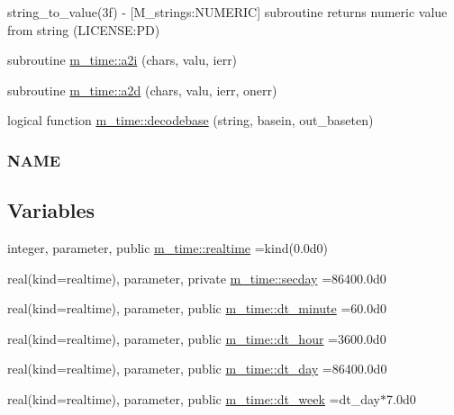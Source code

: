 \begin{DoxyCompactItemize}
\begin{DoxyCompactList}
string\+\_\+to\+\_\+value(3f) -\/ \mbox{[}M\+\_\+strings\+:N\+U\+M\+E\+R\+IC\mbox{]} subroutine returns numeric value from string (L\+I\+C\+E\+N\+SE\+:PD) \end{DoxyCompactList}\item 
subroutine \mbox{\hyperlink{namespacem__time_a200e48a4e0096b4343b0b72c95becd3d}{m\+\_\+time\+::a2i}} (chars, valu, ierr)
\item 
subroutine \mbox{\hyperlink{namespacem__time_a9d508147e28034267073619ba8a0e910}{m\+\_\+time\+::a2d}} (chars, valu, ierr, onerr)
\item 
logical function \mbox{\hyperlink{namespacem__time_a8dacab5686d74326cc68aa91b6f16c2d}{m\+\_\+time\+::decodebase}} (string, basein, out\+\_\+baseten)
\begin{DoxyCompactList}\small\item\em \subsubsection*{N\+A\+ME}\end{DoxyCompactList}\end{DoxyCompactItemize}
\subsection*{Variables}
\begin{DoxyCompactItemize}
\item 
integer, parameter, public \mbox{\hyperlink{namespacem__time_ac10ea9e8d59ec74eaa7d89f2517d7422}{m\+\_\+time\+::realtime}} =kind(0.\+0d0)
\item 
real(kind=realtime), parameter, private \mbox{\hyperlink{namespacem__time_a48130b5a95a3f2e776269dcee1426797}{m\+\_\+time\+::secday}} =86400.\+0d0
\item 
real(kind=realtime), parameter, public \mbox{\hyperlink{namespacem__time_a9fe6fbb44e2779a2fcf96fba36c08918}{m\+\_\+time\+::dt\+\_\+minute}} =60.\+0d0
\item 
real(kind=realtime), parameter, public \mbox{\hyperlink{namespacem__time_aa0ca2172092f5e7dcc9b8524e6516fd8}{m\+\_\+time\+::dt\+\_\+hour}} =3600.\+0d0
\item 
real(kind=realtime), parameter, public \mbox{\hyperlink{namespacem__time_a97725f8d657c24badff19a794f323a6b}{m\+\_\+time\+::dt\+\_\+day}} =86400.\+0d0
\item 
real(kind=realtime), parameter, public \mbox{\hyperlink{namespacem__time_a3d53519e90264faccdae67e389ffc003}{m\+\_\+time\+::dt\+\_\+week}} =dt\+\_\+day$\ast$7.\+0d0
\end{DoxyCompactItemize}


